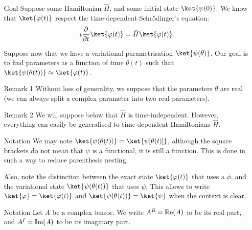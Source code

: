 \documentclass[a4paper]{article}
\begin{document}
\begin{parag}{Goal}
     Suppose some Hamiltonian $\hat{H}$, and some initial state $\ket{\psi\left(0\right)}$. We know that $\ket{\phi\left(t\right)}$ respect the time-dependent Schrödinger's equation:
    \[i \frac{\partial}{\partial t} \ket{\phi\left(t\right)} = \hat{H} \ket{\phi\left(t\right)}.\]

    Suppose now that we have a variational parametrisation $\ket{\psi\left(\theta\right)}$. Our goal is to find parameters as a function of time $\theta\left(t\right)$ such that $\ket{\psi\left(\theta\left(t\right)\right)} \approx \ket{\phi\left(t\right)}$.

    \begin{subparag}{Remark 1}
        Without loss of generality, we suppose that the parameters $\theta$ are real (we can always split a complex parameter into two real parameters).
    \end{subparag}

    \begin{subparag}{Remark 2}
        We will suppose below that $\hat{H}$ is time-independent. However, everything can easily be generalised to time-dependent Hamiltonians $\hat{H}$.
    \end{subparag}

    \begin{subparag}{Notation}
        We may note $\ket{\psi\left(\theta\left(t\right)\right)} = \ket{\psi\left[\theta\left(t\right)\right]}$, although the square brackets do not mean that $\psi$ is a functional, it is still a function. This is done in such a way to reduce parenthesis nesting.

        Also, note the distinction between the exact state $\ket{\phi\left(t\right)}$ that uses a $\phi$, and the variational state $\ket{\psi\left(\theta\left(t\right)\right)} $ that uses $\psi$. This allows to write $\ket{\phi} = \ket{\phi\left(t\right)}$ and $\ket{\psi\left(\theta\left(t\right)\right)} = \ket{\psi}$ when the context is clear.
    \end{subparag}
\end{parag}

\begin{parag}{Notation}
    Let $A$ be a complex tensor. We write $A^R = \cre\left(A\right)$ to be its real part, and $A^I = \cim\left(A\right)$ to be its imaginary part.
\end{parag}
\end{document}
